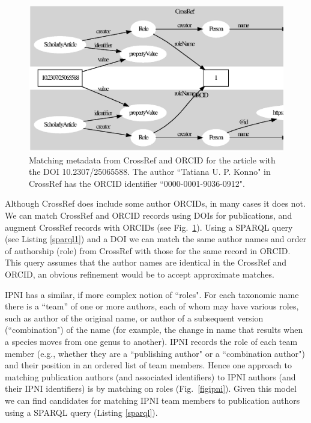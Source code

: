 \documentclass[runningheads]{llncs}
\begin{document}
\begin{figure}
\includegraphics[width=\textwidth]{author.eps}
\caption{Matching metadata from CrossRef and ORCID for the article with the DOI 10.2307/25065588. The author ``Tatiana U. P. Konno" in CrossRef has the ORCID identifier ``0000-0001-9036-0912".} \label{figauthor}
\end{figure}


Although CrossRef does include some author ORCIDs, in many cases it does not. We can match CrossRef and ORCID records using DOIs for publications, and augment CrossRef records with ORCIDs (see Fig.~\ref{figauthor}). Using a SPARQL query (see Listing \ref{sparql1}) and a DOI we can match the same author names and order of authorship (role) from CrossRef with those for the same record in ORCID. This query assumes that the author names are identical in the CrossRef and ORCID, an obvious refinement would be to accept approximate matches.


IPNI has a similar, if more complex notion of ``roles". For each taxonomic name there is a ``team” of one or more authors, each of whom may have various roles, such as author of the original name, or author of a subsequent version (``combination") of the name (for example, the change in name that results when a species moves from one genus to another). IPNI records the role of each team member (e.g., whether they are a ``publishing author" or a ``combination author") and their position in an ordered list of team members. Hence one approach to matching publication authors (and associated identifiers) to IPNI authors (and their IPNI identifiers) is by matching on roles (Fig.~\ref{figipni}). Given this model we can find candidates for matching IPNI team members to publication authors using a SPARQL query (Listing \ref{sparql}).
\end{document}
